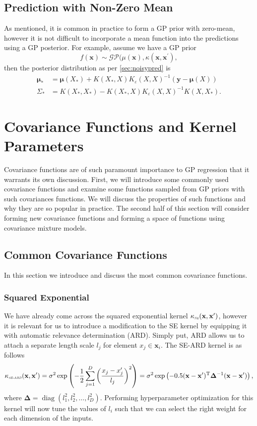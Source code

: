 \documentclass[10pt,a4paper]{article}
\DeclareMathOperator{\diag}{diag}
\numberwithin{equation}{section}
\theoremstyle{plain}
\theoremstyle{definition}
\theoremstyle{own}
\begin{document}
\subsection{Prediction with Non-Zero Mean}
As mentioned, it is common in practice to form a GP prior with zero-mean, however it is not difficult to incorporate a mean function into the predictions using a GP posterior. For example, assume we have a GP prior
\begin{equation}
f(\mathbf{x}) \sim \mathcal{GP}(\mu(\mathbf{x}), \kappa(\mathbf{x}, \mathbf{x}^{\prime}),
\end{equation}
then the posterior distribution as per \ref{sec:noisypred} is
\begin{align}
\boldsymbol\mu_* & = \boldsymbol\mu(X_*) + K(X_*, X) K_\varepsilon(X, X)^{-1} ( \mathbf{y} - \boldsymbol\mu(X) ) \\
\Sigma_* & = K(X_*, X_*) - K(X_*, X) K_\varepsilon(X, X)^{-1}K(X, X_*).
\end{align}
\section{Covariance Functions and Kernel Parameters}
Covariance functions are of such paramount importance to GP regression that it warrants its own discussion. First, we will introduce some commonly used covariance functions and examine some functions sampled from GP priors with such covariances functions. We will discuss the properties of such functions and why they are so popular in practice. The second half of this section will consider forming new covariance functions and forming a space of functions using covariance mixture models.
\subsection{Common Covariance Functions}
In this section we introduce and discuss the most common covariance functions.
\subsubsection{Squared Exponential}
We have already come across the squared exponential kernel $\kappa_{\scaleto{\textit{SE}}{3pt}}(\mathbf{x}, \mathbf{x^{\prime}})$, however it is relevant for us to introduce a modification to the SE kernel by equipping it with automatic relevance determination (ARD). Simply put, ARD allows us to attach a separate length scale $l_j$ for element $x_j \in \mathbf{x}_i$. The SE-ARD kernel is as follows
\begin{equation}
\kappa_{\scaleto{\textit{SE-ARD}}{3pt}}(\mathbf{x}, \mathbf{x^{\prime}}) = \sigma^2 \exp \left( - \frac{1}{2} \sum_{j = 1}^D \left( \frac{x_j - x_j^{\prime}}{l_j} \right)^2 \right) = \sigma^2 \exp \left( -0.5 ( \mathbf{x} - \mathbf{x}^{\prime} )^{\text{T}} \boldsymbol\Delta^{-1} ( \mathbf{x} - \mathbf{x}^{\prime} ) \right),
\end{equation}
where $\boldsymbol\Delta = \diag(l_1^2, l_2^2, \ldots, l_D^2)$. Performing hyperparameter optimization for this kernel will now tune the values of $l_i$ such that we can select the right weight for each dimension of the inputs.
\end{document}
